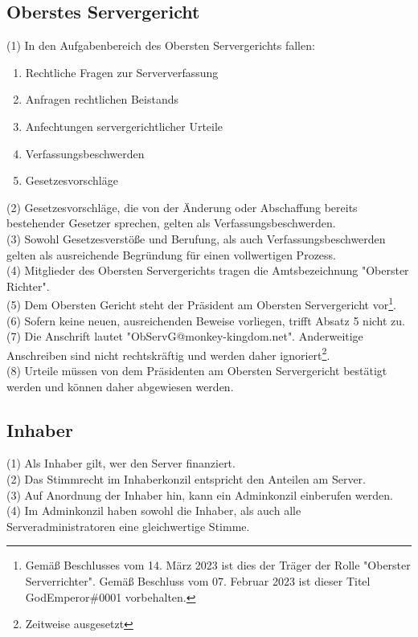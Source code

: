 \documentclass{article}
\begin{document}
\subsection{Oberstes Servergericht}
(1) In den Aufgabenbereich des Obersten Servergerichts fallen:
\begin{enumerate}
    \item Rechtliche Fragen zur Serververfassung
    \item Anfragen rechtlichen Beistands
    \item Anfechtungen servergerichtlicher Urteile
    \item Verfassungsbeschwerden
    \item Gesetzesvorschläge
\end{enumerate}
(2) Gesetzesvorschläge, die von der Änderung oder Abschaffung bereits bestehender Gesetzer sprechen, gelten als Verfassungsbeschwerden.\\
(3) Sowohl Gesetzesverstöße und Berufung, als auch Verfassungsbeschwerden gelten als ausreichende Begründung für einen vollwertigen Prozess.\\
(4) Mitglieder des Obersten Servergerichts tragen die Amtsbezeichnung "Oberster Richter".\\
(5) Dem Obersten Gericht steht der Präsident am Obersten Servergericht vor\footnote{Gemäß Beschlusses vom 14. März 2023 ist dies der Träger der Rolle "Oberster Serverrichter". Gemäß Beschluss vom 07. Februar 2023 ist dieser Titel GodEmperor\#0001 vorbehalten.}.\\
(6) Sofern keine neuen, ausreichenden Beweise vorliegen, trifft Absatz 5 nicht zu.\\
(7) Die Anschrift lautet "ObServG@monkey-kingdom.net". Anderweitige Anschreiben sind nicht rechtskräftig und werden daher ignoriert\footnote{Zeitweise ausgesetzt}.\\
(8) Urteile müssen von dem Präsidenten am Obersten Servergericht bestätigt werden und können daher abgewiesen werden.

\subsection{Inhaber}
(1) Als Inhaber gilt, wer den Server finanziert.\\
(2) Das Stimmrecht im Inhaberkonzil entspricht den Anteilen am Server.\\
(3) Auf Anordnung der Inhaber hin, kann ein Adminkonzil einberufen werden.\\
(4) Im Adminkonzil haben sowohl die Inhaber, als auch alle Serveradministratoren eine gleichwertige Stimme.\\
\end{document}
